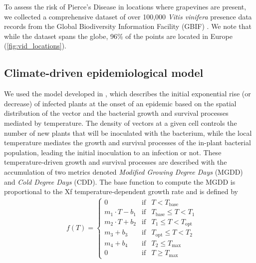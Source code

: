 To assess the risk of Pierce's Disease in locations where grapevines are
present, we collected a comprehensive dataset of over 100,000 \textit{Vitis
    vinifera} presence data records from the Global Biodiversity Information
Facility (GBIF) \cite{noauthor_what_nodate,GBIF}. We note that while the
dataset spans the globe, 96\% of the points are located in Europe
(\cref{fig:vid_locations}).

\subsection{Climate-driven epidemiological model}

We used the model developed in \cite{GimenezRomero2022_CommsBio}, which
describes
the initial exponential rise (or decrease) of infected plants at the onset of
an epidemic based on the spatial distribution of the vector and the bacterial
growth and survival processes mediated by temperature. The density of vectors
at a given cell controls the number of new plants that will be inoculated with
the bacterium, while the local temperature mediates the growth and survival
processes of the in-plant bacterial population, leading the initial inoculation
to an infection or not. These temperature-driven growth and survival processes
are described with the accumulation of two metrics denoted \textit{Modified
    Growing Degree Days} (MGDD) and \textit{Cold Degree Days} (CDD). The base
function to compute the MGDD is proportional to the Xf temperature-dependent
growth rate and is defined by
\begin{align*}
     & f(T)=\left\{\begin{array}{lll}
                       0                & \textrm{if} & T<T_{\textrm{base}}
                       \\
                       m_1\cdot T-b_1   & \textrm{if} & T_{\textrm{base}} \leq
                       T < T_1
                       \\
                       m_2\cdot T + b_2 & \textrm{if} & T_{1} \leq T <
                       T_{\textrm{opt}}
                       \\
                       m_3 + b_3        & \textrm{if} & T_{\textrm{opt}} \leq T
                       < T_2
                       \\
                       m_4 + b_4        & \textrm{if} & T_2 \leq
                       T_{\textrm{max}}
                       \\
                       0                & \textrm{if} & T\geq T_{\textrm{max}}
                   \end{array}\right. \,
\end{align*}
